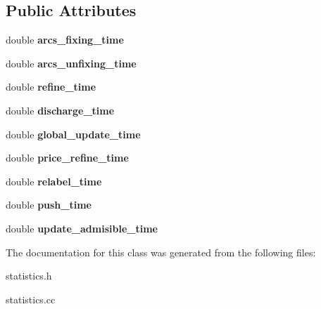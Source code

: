 \subsection*{\-Public \-Attributes}
\begin{DoxyCompactItemize}
\item 
\hypertarget{classflowlessly_1_1Statistics_ab2816798568ca1eee4f6d1926038e417}{double {\bfseries arcs\-\_\-fixing\-\_\-time}}\label{classflowlessly_1_1Statistics_ab2816798568ca1eee4f6d1926038e417}

\item 
\hypertarget{classflowlessly_1_1Statistics_a55632aadc4c3f9b30785cd77685299a7}{double {\bfseries arcs\-\_\-unfixing\-\_\-time}}\label{classflowlessly_1_1Statistics_a55632aadc4c3f9b30785cd77685299a7}

\item 
\hypertarget{classflowlessly_1_1Statistics_a201b3aa2e8cc9d6c3fd27a4238420b87}{double {\bfseries refine\-\_\-time}}\label{classflowlessly_1_1Statistics_a201b3aa2e8cc9d6c3fd27a4238420b87}

\item 
\hypertarget{classflowlessly_1_1Statistics_a416f51c6e9ed293fa37a95a2e731cebe}{double {\bfseries discharge\-\_\-time}}\label{classflowlessly_1_1Statistics_a416f51c6e9ed293fa37a95a2e731cebe}

\item 
\hypertarget{classflowlessly_1_1Statistics_a20385e77700a5dbb23e3dc85377929b2}{double {\bfseries global\-\_\-update\-\_\-time}}\label{classflowlessly_1_1Statistics_a20385e77700a5dbb23e3dc85377929b2}

\item 
\hypertarget{classflowlessly_1_1Statistics_ac4142340fb1fb72e17a08165d42b8212}{double {\bfseries price\-\_\-refine\-\_\-time}}\label{classflowlessly_1_1Statistics_ac4142340fb1fb72e17a08165d42b8212}

\item 
\hypertarget{classflowlessly_1_1Statistics_a5240102a726951ba9c814d205bffd8da}{double {\bfseries relabel\-\_\-time}}\label{classflowlessly_1_1Statistics_a5240102a726951ba9c814d205bffd8da}

\item 
\hypertarget{classflowlessly_1_1Statistics_ab7ce377468e9a414e3f0230cb0746f60}{double {\bfseries push\-\_\-time}}\label{classflowlessly_1_1Statistics_ab7ce377468e9a414e3f0230cb0746f60}

\item 
\hypertarget{classflowlessly_1_1Statistics_a2089b5c4a8308843fed708b6973c326a}{double {\bfseries update\-\_\-admisible\-\_\-time}}\label{classflowlessly_1_1Statistics_a2089b5c4a8308843fed708b6973c326a}

\end{DoxyCompactItemize}


\-The documentation for this class was generated from the following files\-:\begin{DoxyCompactItemize}
\item 
statistics.\-h\item 
statistics.\-cc\end{DoxyCompactItemize}
